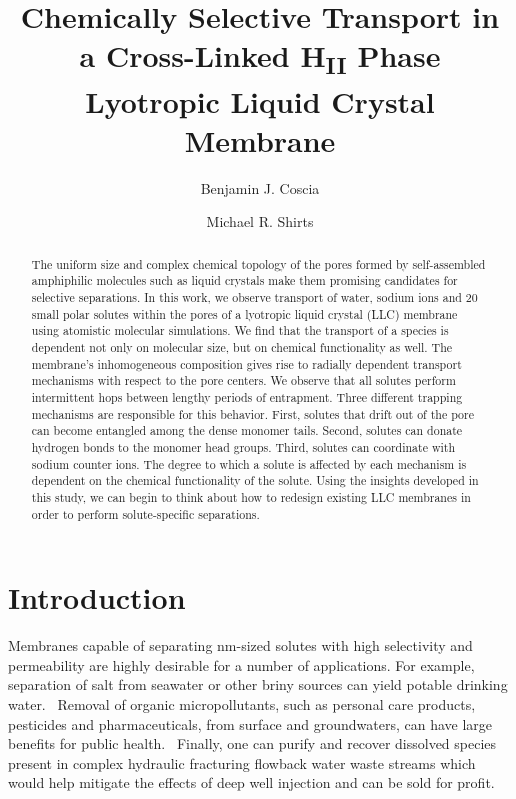 \documentclass[journal=jpcbfk,manuscript=article]{achemso}
\title{Chemically Selective Transport in a Cross-Linked H\textsubscript{II} Phase Lyotropic Liquid Crystal Membrane}
\author{Benjamin J. Coscia}
\affiliation{Department of Chemical and Biological Engineering, University of Colorado Boulder, Boulder, CO 80309, USA}
\author{Michael R. Shirts}
\affiliation{Department of Chemical and Biological Engineering, University of Colorado Boulder, Boulder, CO 80309, USA}
\begin{document}
  \graphicspath{{./figures/}}
  
  \begin{abstract}

  The uniform size and complex chemical topology of the pores formed by
  self-assembled amphiphilic molecules such as liquid crystals make them
  promising candidates for selective separations.
  In this work, we observe transport of water, sodium ions and 20 small polar
  solutes within the pores of a lyotropic liquid crystal (LLC) membrane using
  atomistic molecular simulations. We find that the transport of a species is
  dependent not only on molecular size, but on chemical functionality as well.
  The membrane's inhomogeneous composition gives rise to radially dependent
  transport mechanisms with respect to the pore centers. We observe that all
  solutes perform intermittent hops between lengthy periods of entrapment. Three
  different trapping mechanisms are responsible for this behavior. First, solutes
  that drift out of the pore can become entangled among the dense monomer tails.
  Second, solutes can donate hydrogen bonds to the monomer head groups. Third,
  solutes can coordinate with sodium counter ions.  The degree to which a solute
  is affected by each mechanism is dependent on the chemical functionality of the
  solute. Using the insights developed in this study, we can begin to think about
  how to redesign existing LLC membranes in order to perform solute-specific
  separations.
   
  \end{abstract}

  \section{Introduction}

  Membranes capable of separating nm-sized solutes with high selectivity and
  permeability are highly desirable for a number of applications. For example,
  separation of salt from seawater or other briny sources can yield potable
  drinking water.~\cite{fritzmann_state---art_2007} Removal of organic
  micropollutants, such as personal care products, pesticides and
  pharmaceuticals, from surface and groundwaters, can have large benefits for
  public health.~\cite{schwarzenbach_challenge_2006} Finally, one can purify and
  recover dissolved species present in complex hydraulic fracturing flowback
  water waste streams which would help mitigate the effects of deep well
  injection and can be sold for profit.~\cite{dischinger_application_2017} 
\end{document}
